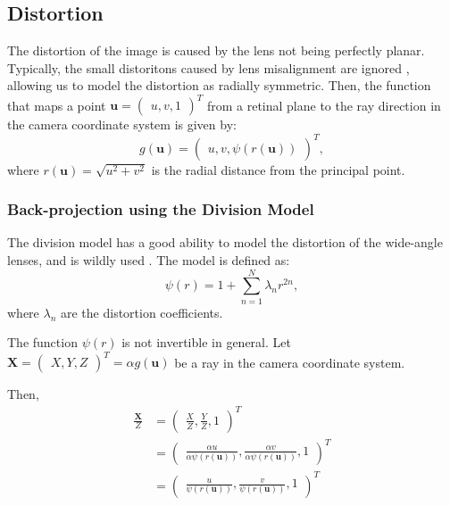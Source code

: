 \subsection{Distortion}\label{sub:distortion}

The distortion of the image is caused by the lens not being perfectly planar.
Typically, the small distoritons caused by lens misalignment are ignored
, allowing us to model the distortion as radially symmetric.
Then, the function that maps a point \(\mathbf{u} = \begin{pmatrix}
	u, v, 1
\end{pmatrix}^{T}\) from a retinal plane  to the
ray direction in the camera coordinate system is given by:
\begin{equation}
	g(\mathbf{u}) = \begin{pmatrix}
		u, v, \psi(r(\mathbf{u}))
	\end{pmatrix}^{T},
\end{equation}
where \(r(\mathbf{u}) = \sqrt{u^2 + v^2}\) is the radial distance from the
principal point.

\subsubsection{Back-projection using the Division Model}\label{subsub:back_projection_using_the_division_model}

The division model has a good ability to model the distortion of the wide-angle
lenses, and is wildly used . The model is defined as:
\begin{equation}
	\psi(r) = 1 + \sum_{n = 1}^{N} \lambda_n r^{2n},
\end{equation}
where \(\lambda_n\) are the distortion coefficients.

The function \(\psi(r)\) is not invertible in general.
Let \(\mathbf{X} = \begin{pmatrix}
	X, Y, Z
\end{pmatrix}^{T} = \alpha g(\mathbf{u})\) be a ray in the camera coordinate system.

Then,
\begin{align}
	\frac{\mathbf{X}}{Z} & =
	\begin{pmatrix}
		\frac{X}{Z}, \frac{Y}{Z}, 1
	\end{pmatrix}^{T}                               \\                & =
	\begin{pmatrix}
		\frac{\alpha u}{\alpha \psi(r(\mathbf{u}))},
		\frac{\alpha v}{\alpha \psi(r(\mathbf{u}))},
		1
	\end{pmatrix}^{T}  \\
	                     & = \label{eq:division_derivation1}
	\begin{pmatrix}
		\frac{u}{\psi(r(\mathbf{u}))},
		\frac{v}{\psi(r(\mathbf{u}))},
		1
	\end{pmatrix}^{T}
\end{align}

